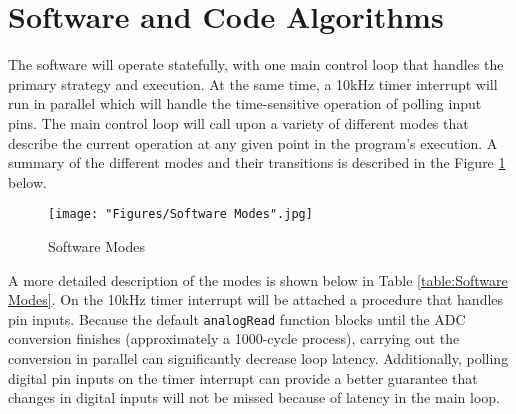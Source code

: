\documentclass[11pt, oneside]{article} %
\begin{document}

\section{Software and Code Algorithms}	
The software will operate statefully, with one main control loop that handles the primary strategy and execution. At the same time, a 10kHz timer interrupt will run in parallel which will handle the time-sensitive operation of polling input pins.
The main control loop will call upon a variety of different modes that describe the current operation at any given point in the program's execution. A summary of the different modes and their transitions is described in the Figure \ref{fig:4} below.

\begin{figure}[h]
	\centering
	\texttt{[image: "Figures/Software Modes".jpg]}
	\caption[Software Modes]{Software Modes}
	\label{fig:4}
\end{figure}

A more detailed description of the modes is shown below in Table \ref{table:Software Modes}.
On the 10kHz timer interrupt will be attached a procedure that handles pin inputs. Because the default \texttt{analogRead} function blocks until the ADC conversion finishes (approximately a 1000-cycle process), carrying out the conversion in parallel can significantly decrease loop latency. Additionally, polling digital pin inputs on the timer interrupt can provide a better guarantee that changes in digital inputs will not be missed because of latency in the main loop.
\end{document}
